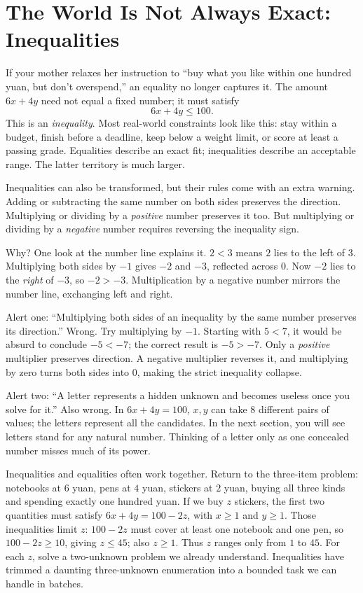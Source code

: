 \section{The World Is Not Always Exact: Inequalities}

If your mother relaxes her instruction to ``buy what you like within one hundred yuan, but don't overspend,'' an equality no longer captures it. The amount $6x+4y$ need not equal a fixed number; it must satisfy
\[
6x+4y\leq 100.
\]
This is an \emph{inequality}. Most real-world constraints look like this: stay within a budget, finish before a deadline, keep below a weight limit, or score at least a passing grade. Equalities describe an exact fit; inequalities describe an acceptable range. The latter territory is much larger.

Inequalities can also be transformed, but their rules come with an extra warning. Adding or subtracting the same number on both sides preserves the direction. Multiplying or dividing by a \emph{positive} number preserves it too. But multiplying or dividing by a \emph{negative} number requires reversing the inequality sign.

Why? One look at the number line explains it. $2<3$ means $2$ lies to the left of $3$. Multiplying both sides by $-1$ gives $-2$ and $-3$, reflected across $0$. Now $-2$ lies to the \emph{right} of $-3$, so $-2>-3$. Multiplication by a negative number mirrors the number line, exchanging left and right.

\begin{fanli}
Alert one: ``Multiplying both sides of an inequality by the same number preserves its direction.'' Wrong. Try multiplying by $-1$. Starting with $5<7$, it would be absurd to conclude $-5<-7$; the correct result is $-5>-7$. Only a \emph{positive} multiplier preserves direction. A negative multiplier reverses it, and multiplying by zero turns both sides into $0$, making the strict inequality collapse.

Alert two: ``A letter represents a hidden unknown and becomes useless once you solve for it.'' Also wrong. In $6x+4y=100$, $x,y$ can take $8$ different pairs of values; the letters represent all the candidates. In the next section, you will see letters stand for any natural number. Thinking of a letter only as one concealed number misses much of its power.
\end{fanli}

Inequalities and equalities often work together. Return to the three-item problem: notebooks at $6$ yuan, pens at $4$ yuan, stickers at $2$ yuan, buying all three kinds and spending exactly one hundred yuan. If we buy $z$ stickers, the first two quantities must satisfy $6x+4y=100-2z$, with $x\geq1$ and $y\geq1$. Those inequalities limit $z$: $100-2z$ must cover at least one notebook and one pen, so $100-2z\geq10$, giving $z\leq45$; also $z\geq1$. Thus $z$ ranges only from $1$ to $45$. For each $z$, solve a two-unknown problem we already understand. Inequalities have trimmed a daunting three-unknown enumeration into a bounded task we can handle in batches.

